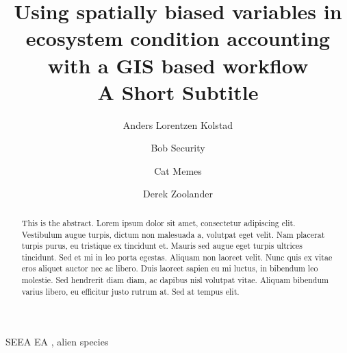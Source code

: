 \documentclass[
  super,
  preprint,
  3p]{elsarticle}
\begin{document}
\begin{frontmatter}
\title{Using spatially biased variables in ecosystem condition
accounting with a GIS based workflow \\\large{A Short Subtitle} }
\author[1]{Anders Lorentzen Kolstad%
%
}
\author[2]{Bob Security%
%
}
\author[2]{Cat Memes%
%
}
\author[]{Derek Zoolander%
%
}



        
\begin{abstract}
This is the abstract. Lorem ipsum dolor sit amet, consectetur adipiscing
elit. Vestibulum augue turpis, dictum non malesuada a, volutpat eget
velit. Nam placerat turpis purus, eu tristique ex tincidunt et. Mauris
sed augue eget turpis ultrices tincidunt. Sed et mi in leo porta
egestas. Aliquam non laoreet velit. Nunc quis ex vitae eros aliquet
auctor nec ac libero. Duis laoreet sapien eu mi luctus, in bibendum leo
molestie. Sed hendrerit diam diam, ac dapibus nisl volutpat vitae.
Aliquam bibendum varius libero, eu efficitur justo rutrum at. Sed at
tempus elit.
\end{abstract}





\begin{keyword}
    SEEA EA \sep 
    alien species
\end{keyword}
\end{frontmatter}
    \ifdefined\Shaded\renewenvironment{Shaded}{\begin{tcolorbox}[boxrule=0pt, frame hidden, borderline west={3pt}{0pt}{shadecolor}, interior hidden, enhanced, sharp corners, breakable]}{\end{tcolorbox}}\fi
\end{document}
